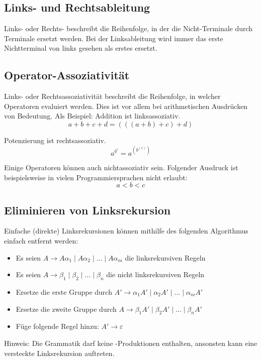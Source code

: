 \subsection{Links- und Rechtsableitung}

Links- oder Rechts- beschreibt die Reihenfolge, in der die Nicht-Terminale durch
Terminale ersetzt werden. Bei der Linksableitung wird immer das erste
Nichtterminal von links gesehen als erstes ersetzt.


\subsection{Operator-Assoziativität}

Links- oder Rechtsassoziativität beschreibt die Reihenfolge, in welcher
Operatoren evaluiert werden.  Dies ist vor allem bei arithmetischen Ausdrücken
von Bedeutung. Als Beispiel: Addition ist linksassoziativ.
\[
	a + b + c + d = (((a + b) + c) + d)
\]

Potenzierung ist rechtsassoziativ.
\[
	a^{b^c} = a^{(b^{(c)})}
\]

Einige Operatoren können auch nichtassoziativ sein. Folgender Ausdruck ist
beispielsweise in vielen Programmiersprachen nicht erlaubt:
\[
	a < b < c
\]


\subsection{Eliminieren von Linksrekursion}

Einfache (direkte) Linksrekursionen können mithilfe des folgenden Algorithmus einfach entfernt
werden:

\begin{itemize}
	\item Es seien $A \rightarrow A\alpha_1 \mid A\alpha_2 \mid \ldots \mid A\alpha_m$ die
		linksrekursiven Regeln
	\item Es seien $A \rightarrow \beta_1 \mid \beta_2 \mid \ldots \mid \beta_n$ die nicht
		linksrekursiven Regeln
	\item Ersetze die erste Gruppe durch $A' \rightarrow \alpha_1A'\mid \alpha_2A' \mid \ldots \mid
		\alpha_mA'$
	\item Ersetze die zweite Gruppe durch $A \rightarrow \beta_1A' \mid \beta_2A' \mid \ldots \mid
		\beta_nA'$
	\item Füge folgende Regel hinzu: $A' \rightarrow \varepsilon$
\end{itemize}

Hinweis: Die Grammatik darf keine \textepsilon-Produktionen enthalten, ansonsten kann eine
versteckte Linksrekursion auftreten.

